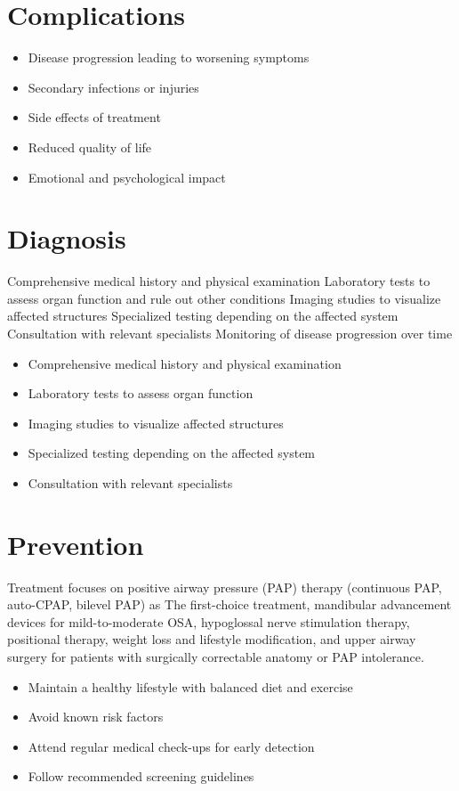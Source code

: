 \section{Complications}
\begin{itemize}[noitemsep]
  \item Disease progression leading to worsening symptoms
  \item Secondary infections or injuries
  \item Side effects of treatment
  \item Reduced quality of life
  \item Emotional and psychological impact
\end{itemize}
\section{Diagnosis}
Comprehensive medical history and physical examination Laboratory tests to assess organ function and rule out other conditions Imaging studies to visualize affected structures Specialized testing depending on the affected system Consultation with relevant specialists Monitoring of disease progression over time

\begin{itemize}[noitemsep]
  \item Comprehensive medical history and physical examination
  \item Laboratory tests to assess organ function
  \item Imaging studies to visualize affected structures
  \item Specialized testing depending on the affected system
  \item Consultation with relevant specialists
\end{itemize}
\section{Prevention}
Treatment focuses on positive airway pressure (PAP) therapy (continuous PAP, auto-CPAP, bilevel PAP) as The first-choice treatment, mandibular advancement devices for mild-to-moderate OSA, hypoglossal nerve stimulation therapy, positional therapy, weight loss and lifestyle modification, and upper airway surgery for patients with surgically correctable anatomy or PAP intolerance.

\begin{itemize}[noitemsep]
  \item Maintain a healthy lifestyle with balanced diet and exercise
  \item Avoid known risk factors
  \item Attend regular medical check-ups for early detection
  \item Follow recommended screening guidelines
\end{itemize}
